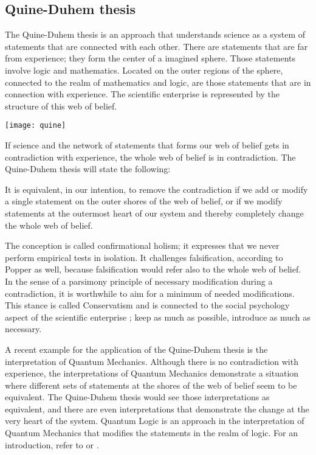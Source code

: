 \documentclass{article}
\begin{document}
\newpage 

\subsection{Quine-Duhem thesis}

The Quine-Duhem thesis is an approach that understands science as a system of statements that are connected with each other. There are statements that are far from experience; they form the center of a imagined sphere. Those statements involve logic and mathematics. Located on the outer regions of the sphere, connected to the realm of mathematics and logic, are those statements that are in connection with experience. The scientific enterprise is represented by the structure of this web of belief. \newline


\begin{minipage}{\textwidth}
\centering
\texttt{[image: quine]}
\end{minipage}
\bigskip


If science and the network of statements that forms our web of belief gets in contradiction with experience, the whole web of belief is in contradiction. The Quine-Duhem thesis will state the following: \newline

It is equivalent, in our intention, to remove the contradiction if we add or modify a single statement on the outer shores of the web of belief, or if we modify statements at the outermost heart of our system and thereby completely change the whole web of belief. \newline

The conception is called confirmational holism; it expresses that we never perform empirical tests in isolation. It challenges falsification, according to Popper as well, because falsification would refer also to the whole web of belief. In the sense of a parsimony principle of necessary modification during a contradiction, it is worthwhile to aim for a minimum of needed modifications. This stance is called Conservatism and is connected to the social psychology aspect of the scientific enterprise \cite[Chapter 2.1]{sep-scientific-underdetermination}; keep as much as possible, introduce as much as necessary.  

A recent example for the application of the Quine-Duhem thesis is the interpretation of Quantum Mechanics. Although there is no contradiction with experience, the interpretations of Quantum Mechanics demonstrate a situation where different sets of statements at the shores of the web of belief seem to be equivalent. The Quine-Duhem thesis would see those interpretations as equivalent, and there are even interpretations that demonstrate the change at the very heart of the system. Quantum Logic is an approach in the interpretation of Quantum Mechanics that modifies the statements in the realm of logic. For an introduction, refer to \cite[]{mittelstaedt1978quantum} or \cite[]{van1980scientific}.
\end{document}
